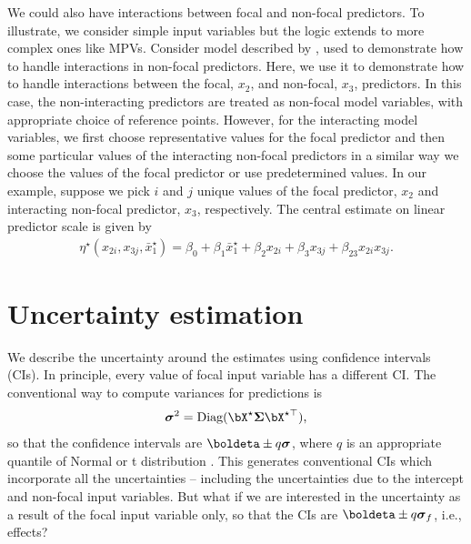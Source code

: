 We could also have interactions between focal and non-focal predictors. To illustrate, we consider simple input variables but the logic extends to more complex ones like MPVs. Consider model described by , used to demonstrate how to handle interactions in non-focal predictors. Here, we use it to demonstrate how to handle interactions between the focal, $x_2$, and non-focal, $x_3$, predictors. In this case, the non-interacting predictors are treated as non-focal model variables, with appropriate choice of reference points. However, for the interacting model variables, we first choose representative values for the focal predictor and then some particular values of the interacting non-focal predictors in a similar way we choose the values of the focal predictor or use predetermined values. In our example, suppose we pick $i$ and $j$ unique values of the focal predictor, $x_2$ and interacting non-focal predictor, $x_3$, respectively. The central estimate on linear predictor scale is given by
%
\begin{align*}
\eta^\star(x_{2i}, x_{3j}, {\bar{x}^\star_1}) = \beta_0 + \beta_1 \bar{x}^\star_1 + \beta_2x_{2i} + \beta_3x_{3j} + \beta_{23}x_{2i}x_{3j}.
\end{align*}
%

\section{Uncertainty estimation}

We describe the uncertainty around the estimates using confidence intervals (CIs). In principle, every value of focal input variable has a different CI. The conventional way to compute variances for predictions is 
%
\begin{align}\label{eq:conventional_variance}
\boldsymbol\sigma^2 = \textrm{Diag}(\bX^\star \boldsymbol{\Sigma} \bX^{\star\top}), 
\end{align}
so that the confidence intervals are $\boldeta \pm q\boldsymbol\sigma$, where $q$ is an appropriate quantile of Normal or t distribution \citep{lenth2018package, fox2009effect}. This generates conventional CIs which incorporate all the uncertainties -- including the uncertainties due to the intercept and non-focal input variables.  But what if we are interested in the uncertainty as a result of the focal input variable only, so that the CIs are $\boldeta \pm q \boldsymbol \sigma_f$, i.e., effects? 

